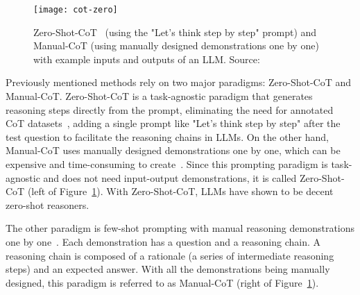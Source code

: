 \begin{figure}[h!]
	\centering
	\texttt{[image: cot-zero]}
	\caption{Zero-Shot-CoT~\cite{kojima2023large} (using the "Let’s think step by step" prompt) and Manual-CoT\cite{wei2022chain} (using manually designed demonstrations one by one) with example inputs and outputs of an LLM. Source: \textcite{zhang2022automatic}}
	\label{fig:zero-shot-cot}
\end{figure}

Previously mentioned methods rely on two major paradigms: Zero-Shot-CoT and Manual-CoT\@.
Zero-Shot-CoT is a task-agnostic paradigm that generates reasoning steps directly from the prompt, eliminating the need for annotated CoT datasets~\cite{kojima2023large}, adding a single prompt like "Let’s think step by step" after the test question to facilitate the reasoning chains in LLMs.
On the other hand, Manual-CoT uses manually designed demonstrations one by one, which can be expensive and time-consuming to create~\cite{wei2022chain}.
Since this prompting paradigm is task-agnostic and does not need input-output demonstrations, it is called Zero-Shot-CoT (left of Figure~\ref{fig:zero-shot-cot}).
With Zero-Shot-CoT, LLMs have shown to be decent zero-shot reasoners.

The other paradigm is few-shot prompting with manual reasoning demonstrations one by one~\cite{wei2022chain}.
Each demonstration has a question and a reasoning chain.
A reasoning chain is composed of a rationale (a series of intermediate reasoning steps) and an expected answer.
With all the demonstrations being manually designed, this paradigm is referred to as Manual-CoT (right of Figure~\ref{fig:zero-shot-cot}).

